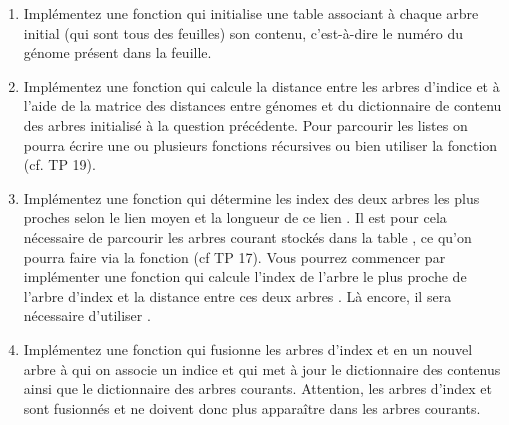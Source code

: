 \documentclass[a4paper, 10pt]{article}
\begin{document}
\begin{enumerate}[resume]
\item Implémentez une fonction  qui initialise une table associant à chaque arbre initial (qui sont tous des feuilles) son contenu, c'est-à-dire le numéro du génome présent dans la feuille.
\item Implémentez une fonction  qui calcule la distance entre les arbres d'indice  et  à l'aide de la matrice des distances entre génomes et du dictionnaire de contenu des arbres initialisé à la question précédente. Pour parcourir les listes on pourra écrire une ou plusieurs fonctions récursives ou bien utiliser la fonction  (cf. TP 19).
\item Implémentez une fonction  qui détermine les index des deux arbres  les plus proches selon le lien moyen et la longueur de ce lien . Il est pour cela nécessaire de parcourir les arbres courant stockés dans la table , ce qu'on pourra faire via la fonction  (cf TP 17). Vous pourrez commencer par implémenter une fonction  qui calcule l'index  de l'arbre le plus proche de l'arbre d'index  et la distance entre ces deux arbres . Là encore, il sera nécessaire d'utiliser .
\item Implémentez une fonction  qui fusionne les arbres d'index  et  en un nouvel arbre à qui on associe un indice  et qui met à jour le dictionnaire des contenus ainsi que le dictionnaire des arbres courants. Attention, les arbres d'index  et  sont fusionnés et ne doivent donc plus apparaître dans les arbres courants.

\end{enumerate}
\end{document}
